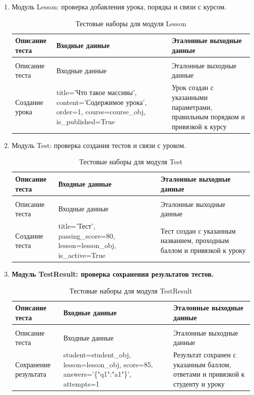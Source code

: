 \begin{enumerate}
	\item Модуль Lesson: проверка добавления урока, порядка и связи с курсом.
	\begin{xltabular}{\textwidth}{|p{3cm}|p{6cm}|p{6cm}|}
		\caption{Тестовые наборы для модуля Lesson\label{tab:lesson_tests}}\\
		\hline
		Описание теста & Входные данные & Эталонные выходные данные \\ \hline
		\endfirsthead
		\\
		\hline
		Описание теста & Входные данные & Эталонные выходные данные \\ \hline
		\endhead
		Создание урока & title='Что такое массивы', content='Содержимое урока', order=1, course=course\_obj, is\_published=True & Урок создан с указанными параметрами, правильным порядком и привязкой к курсу \\ \hline
	\end{xltabular}
	
	\item Модуль Test: проверка создания тестов и связи с уроком.
	\begin{xltabular}{\textwidth}{|p{3cm}|p{6cm}|p{6cm}|}
		\caption{Тестовые наборы для модуля Test\label{tab:test_tests}}\\
		\hline
		Описание теста & Входные данные & Эталонные выходные данные \\ \hline
		\endfirsthead
		\\
		\hline
		Описание теста & Входные данные & Эталонные выходные данные \\ \hline
		\endhead
		Создание теста & title='Тест', passing\_score=80, lesson=lesson\_obj, is\_active=True & Тест создан с указанным названием, проходным баллом и привязкой к уроку \\ \hline
	\end{xltabular}
	
	\item \textbf{Модуль TestResult: проверка сохранения результатов тестов.}
	\begin{xltabular}{\textwidth}{|p{3cm}|p{6cm}|p{6cm}|}
		\caption{Тестовые наборы для модуля TestResult\label{tab:testresult_tests}}\\
		\hline
		Описание теста & Входные данные & Эталонные выходные данные \\ \hline
		\endfirsthead
		\\
		\hline
		Описание теста & Входные данные & Эталонные выходные данные \\ \hline
		\endhead
		Сохранение результата & student=student\_obj, lesson=lesson\_obj, score=85, answers='\{"q1":"a1"\}', attempts=1 & Результат сохранен с указанным баллом, ответами и привязкой к студенту и уроку \\ \hline
	\end{xltabular}
	

\end{enumerate}
